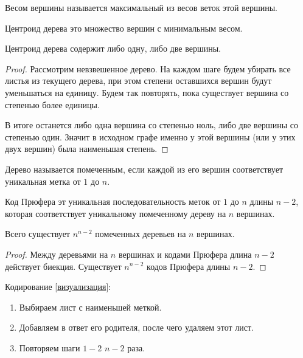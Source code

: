 \begin{definition}
  Весом вершины называется максимальный из весов веток этой вершины.
\end{definition}

\begin{definition}
  Центроид дерева это множество вершин с минимальным весом.
\end{definition}

\begin{lemma}
  Центроид дерева содержит либо одну, либо две вершины.
\end{lemma}
\begin{proof}
  Рассмотрим невзвешенное дерево. На каждом шаге будем убирать все листья из
  текущего дерева, при этом степени оставшихся вершин будут уменьшаться на
  единицу. Будем так повторять, пока существует вершина со степенью более
  единицы.
  
  В итоге останется либо одна вершина со степенью ноль, либо две вершины со
  степенью один. Значит в исходном графе именно у этой вершины (или у этих двух
  вершин) была наименьшая степень.
\end{proof}

\begin{definition}
  Дерево называется помеченным, если каждой из его вершин соответствует
  уникальная метка от \(1\) до \(n\).
\end{definition}

\begin{definition}
  Код Прюфера эт уникальная последовательность меток от \(1\) до \(n\) длины
  \(n - 2\), которая соответствует уникальному помеченному дереву на \(n\)
  вершинах.
\end{definition}

\begin{lemma}
  Всего существует \(n^{n - 2}\) помеченных деревьев на \(n\) вершинах.
\end{lemma}
\begin{proof}
  Между деревьями на \(n\) вершинах и кодами Прюфера длина \(n -2\) действует
  биекция. Существует \(n^{n - 2}\) кодов Прюфера длины \(n - 2\).
\end{proof}

Кодирование
[\href{https://www.youtube.com/watch?v=Caqn-Vx4PoY}{визуализация}]:
\begin{enumerate}
  \item Выбираем лист с наименьшей меткой.
  \item Добавляем в ответ его родителя, после чего удаляем этот лист.
  \item Повторяем шаги \(1-2\) \(n - 2\) раза.
\end{enumerate}

